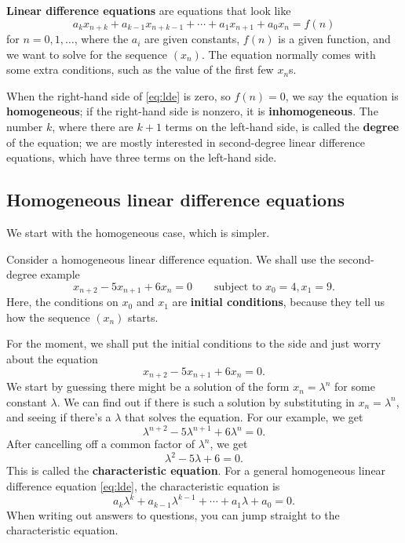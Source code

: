 \documentclass[
  a4paper,
]{article}
\theoremstyle{definition}
\theoremstyle{definition}
\theoremstyle{definition}
\theoremstyle{remark}
\begin{document}
\textbf{Linear difference equations} are equations that look like
\begin{equation}
a_k x_{n+k} + a_{k-1} x_{n+k-1} + \cdots + a_1 x_{n+1} + a_0 x_n = f(n) \label{eq:lde} 
\end{equation}
for \(n = 0,1,\dots\), where the \(a_i\) are given constants, \(f(n)\) is a given function, and we want to solve for the sequence \((x_n)\). The equation normally comes with some extra conditions, such as the value of the first few \(x_n\)s.

When the right-hand side of \eqref{eq:lde} is zero, so \(f(n) = 0\), we say the equation is \textbf{homogeneous}; if the right-hand side is nonzero, it is \textbf{inhomogeneous}. The number \(k\), where there are \(k+1\) terms on the left-hand side, is called the \textbf{degree} of the equation; we are mostly interested in second-degree linear difference equations, which have three terms on the left-hand side.

\hypertarget{hom-ldes}{%
\subsection{Homogeneous linear difference equations}\label{hom-ldes}}

We start with the homogeneous case, which is simpler.

Consider a homogeneous linear difference equation. We shall use the second-degree example
\[ x_{n+2} - 5x_{n+1} + 6x_{n} = 0 \qquad \text{subject to } x_0 = 4, x_1 = 9 .  \]
Here, the conditions on \(x_0\) and \(x_1\) are \textbf{initial conditions}, because they tell us how the sequence \((x_n)\) starts.

For the moment, we shall put the initial conditions to the side and just worry about the equation
\[ x_{n+2} - 5x_{n+1} + 6x_{n} = 0 . \]
We start by guessing there might be a solution of the form \(x_n = \lambda^n\) for some constant \(\lambda\). We can find out if there is such a solution by substituting in \(x_n = \lambda^n\), and seeing if there's a \(\lambda\) that solves the equation. For our example, we get
\[ \lambda^{n+2} - 5 \lambda^{n+1} + 6\lambda^n = 0 . \]
After cancelling off a common factor of \(\lambda^n\), we get
\[ \lambda^2 - 5 \lambda + 6 = 0 . \]
This is called the \textbf{characteristic equation}. For a general homogeneous linear difference equation \eqref{eq:lde}, the characteristic equation is
\begin{equation}
  a_k \lambda^{k} + a_{k-1} \lambda^{k-1} + \cdots + a_1 \lambda + a_0 = 0 .  \label{eq:cheq} 
\end{equation}
When writing out answers to questions, you can jump straight to the characteristic equation.
\end{document}
